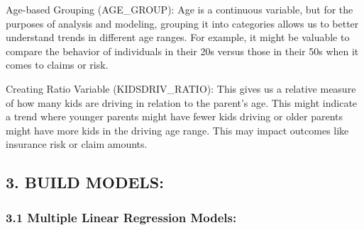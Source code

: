 \documentclass[
]{article}
\newenvironment{Shaded}{\begin{snugshade}}{\end{snugshade}}
\newcommand{\AttributeTok}[1]{\textcolor[rgb]{0.13,0.29,0.53}{#1}}
\newcommand{\CommentTok}[1]{\textcolor[rgb]{0.56,0.35,0.01}{\textit{#1}}}
\newcommand{\ConstantTok}[1]{\textcolor[rgb]{0.56,0.35,0.01}{#1}}
\newcommand{\DecValTok}[1]{\textcolor[rgb]{0.00,0.00,0.81}{#1}}
\newcommand{\FunctionTok}[1]{\textcolor[rgb]{0.13,0.29,0.53}{\textbf{#1}}}
\newcommand{\NormalTok}[1]{#1}
\newcommand{\OtherTok}[1]{\textcolor[rgb]{0.56,0.35,0.01}{#1}}
\newcommand{\SpecialCharTok}[1]{\textcolor[rgb]{0.81,0.36,0.00}{\textbf{#1}}}
\newcommand{\StringTok}[1]{\textcolor[rgb]{0.31,0.60,0.02}{#1}}
\begin{document}
Age-based Grouping (AGE\_GROUP): Age is a continuous variable, but for
the purposes of analysis and modeling, grouping it into categories
allows us to better understand trends in different age ranges. For
example, it might be valuable to compare the behavior of individuals in
their 20s versus those in their 50s when it comes to claims or risk.

\begin{Shaded}
\end{Shaded}

Creating Ratio Variable (KIDSDRIV\_RATIO): This gives us a relative
measure of how many kids are driving in relation to the parent's age.
This might indicate a trend where younger parents might have fewer kids
driving or older parents might have more kids in the driving age range.
This may impact outcomes like insurance risk or claim amounts.

\begin{Shaded}
\end{Shaded}

\subsection{3. BUILD MODELS:}\label{build-models}

\subsubsection{3.1 Multiple Linear Regression
Models:}\label{multiple-linear-regression-models}
\end{document}
